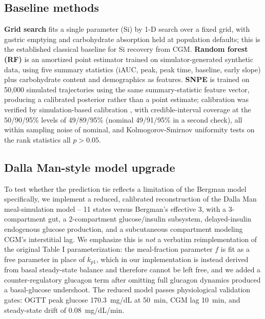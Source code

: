 \documentclass[letterpaper]{article} %
\begin{document}
\subsection{Baseline methods}
\textbf{Grid search} fits a single parameter (Si) by 1-D search over a fixed grid, with gastric
emptying and carbohydrate absorption held at population defaults; this is the established
classical baseline for Si recovery from CGM. \textbf{Random forest (RF)} is an amortized point
estimator trained on simulator-generated synthetic data, using five summary statistics (iAUC,
peak, peak time, baseline, early slope) plus carbohydrate content and demographics as features.
\textbf{SNPE} \citep{tejerocantero2020sbi} is trained on 50{,}000 simulated trajectories using the
same summary-statistic feature vector, producing a calibrated posterior rather than a point
estimate; calibration was verified by simulation-based calibration \citep{talts2018sbc}, with
credible-interval coverage at the 50/90/95\% levels of 49/89/95\% (nominal 49/91/95\% in a
second check), all within sampling noise of nominal, and Kolmogorov-Smirnov uniformity tests on the
rank statistics all $p>0.05$.

\subsection{Dalla Man-style model upgrade}
To test whether the prediction tie reflects a limitation of the Bergman model specifically, we
implement a reduced, calibrated reconstruction of the Dalla Man meal-simulation model
\citep{dallaman2007} -- 11 states versus Bergman's effective 3, with a 3-compartment gut, a
2-compartment glucose/insulin subsystem, delayed-insulin endogenous glucose production, and a
subcutaneous compartment modeling CGM's interstitial lag. We emphasize this is \emph{not} a
verbatim reimplementation of the original Table I parameterization: the meal-fraction parameter $f$
is fit as a free parameter in place of $k_{p1}$, which in our implementation is instead derived
from basal steady-state balance and therefore cannot be left free, and we added a
counter-regulatory glucagon term after omitting full glucagon dynamics produced a basal-glucose
undershoot. The reduced model passes physiological validation gates: OGTT peak glucose
170.3~mg/dL at 50~min, CGM lag 10~min, and steady-state drift of 0.08~mg/dL/min.
\end{document}
